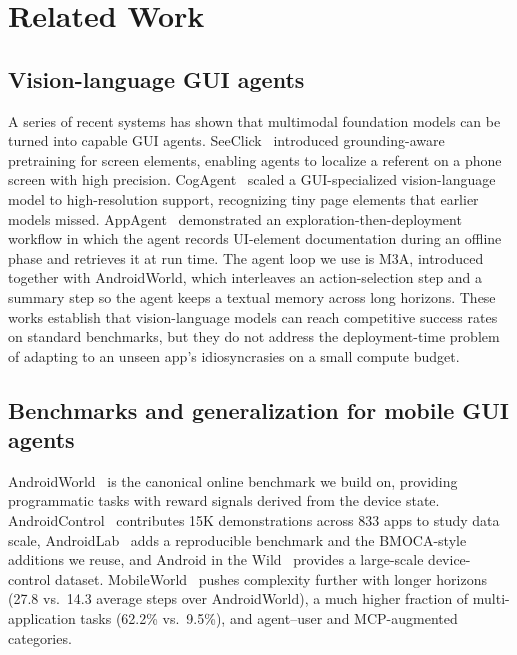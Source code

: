 \section{Related Work}
\label{sec:related}

\subsection{Vision-language GUI agents}

A series of recent systems has shown that multimodal foundation models can be
turned into capable GUI agents. SeeClick~\citep{cheng2024seeclick} introduced
grounding-aware pretraining for screen elements, enabling agents to localize a
referent on a phone screen with high precision. CogAgent~\citep{hong2024cogagent}
scaled a GUI-specialized vision-language model to high-resolution support,
recognizing tiny page elements that earlier models missed.
AppAgent~\citep{yang2023appagent} demonstrated an exploration-then-deployment
workflow in which the agent records UI-element documentation during an offline
phase and retrieves it at run time. The agent loop we use is M3A, introduced
together with AndroidWorld, which interleaves an action-selection step and a
summary step so the agent keeps a textual memory across long horizons. These
works establish that vision-language models can reach competitive success rates
on standard benchmarks, but they do not address the deployment-time problem of
adapting to an unseen app's idiosyncrasies on a small compute budget.

\subsection{Benchmarks and generalization for mobile GUI agents}

AndroidWorld~\citep{rawles2024androidworld} is the canonical online benchmark we
build on, providing programmatic tasks with reward signals derived from the
device state. AndroidControl~\citep{li2024androidcontrol} contributes 15K
demonstrations across 833 apps to study data scale, AndroidLab~\citep{xu2024androidlab}
adds a reproducible benchmark and the BMOCA-style additions we reuse, and Android
in the Wild~\citep{rawles2023aitw} provides a large-scale device-control dataset.
MobileWorld~\citep{mobileworld2025} pushes complexity further with longer
horizons (27.8 vs.\ 14.3 average steps over AndroidWorld), a much higher fraction
of multi-application tasks (62.2\% vs.\ 9.5\%), and agent--user and MCP-augmented
categories.


